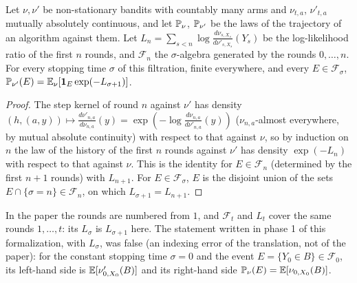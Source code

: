 \begin{lemma}
  \label{lem:change_of_measure}
  \leanok
  Let $\nu, \nu'$ be non-stationary bandits with countably many arms and $\nu_{t,a}$, $\nu'_{t,a}$
  mutually absolutely continuous, and let $\mathbb{P}_\nu$, $\mathbb{P}_{\nu'}$ be the laws of the
  trajectory of an algorithm against them. Let
  $L_n = \sum_{s < n} \log \frac{d\nu_{s, X_s}}{d\nu'_{s, X_s}}(Y_s)$ be the log-likelihood ratio
  of the first $n$ rounds, and $\mathcal{F}_n$ the $\sigma$-algebra generated by the rounds
  $0, \dots, n$. For every stopping time $\sigma$ of this filtration, finite everywhere, and every
  $E \in \mathcal{F}_\sigma$, $\mathbb{P}_{\nu'}(E) = \mathbb{E}_\nu[\mathbf{1}_E \exp(-L_{\sigma + 1})]$.
\end{lemma}

\begin{proof}
  \leanok
  The step kernel of round $n$ against $\nu'$ has density
  $(h, (a, y)) \mapsto \frac{d\nu'_{n, a}}{d\nu_{n, a}}(y)
  = \exp(-\log \frac{d\nu_{n, a}}{d\nu'_{n, a}}(y))$ ($\nu_{n, a}$-almost everywhere, by mutual
  absolute continuity) with respect to that against $\nu$, so by induction on $n$ the law of the
  history of the first $n$ rounds against $\nu'$ has density $\exp(-L_n)$ with respect to that
  against $\nu$. This is the identity for $E \in \mathcal{F}_n$ (determined by the first $n + 1$
  rounds) with $L_{n + 1}$. For $E \in \mathcal{F}_\sigma$, $E$ is the disjoint union of the sets
  $E \cap \{\sigma = n\} \in \mathcal{F}_n$, on which $L_{\sigma + 1} = L_{n + 1}$.
\end{proof}

\begin{remark}
  \label{rem:change_of_measure_index}
  In the paper the rounds are numbered from $1$, and $\mathcal{F}_t$ and $L_t$ cover the same
  rounds $1, \dots, t$: its $L_\sigma$ is $L_{\sigma + 1}$ here. The statement written in phase 1
  of this formalization, with $L_\sigma$, was false (an indexing error of the translation, not of
  the paper): for the constant stopping time $\sigma = 0$ and the event
  $E = \{Y_0 \in B\} \in \mathcal{F}_0$, its left-hand side is $\mathbb{E}[\nu'_{0, X_0}(B)]$ and its
  right-hand side $\mathbb{P}_\nu(E) = \mathbb{E}[\nu_{0, X_0}(B)]$.
\end{remark}

